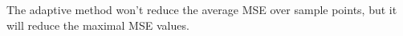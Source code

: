 The adaptive method won't reduce the average MSE over sample points,
but it will reduce the maximal
MSE values. 


